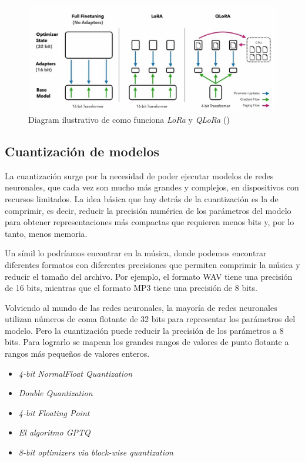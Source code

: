 \begin{figure}[H]
    \begin{center}
      \includegraphics[width=12cm]{figuras/Capitulo_03/QLoRa.jpg}
    \end{center}
    \caption[Diagram ilustrativo de como funciona \textit{LoRa} y \textit{QLoRa}]{Diagram ilustrativo de como funciona \textit{LoRa} y \textit{QLoRa} (\cite{DettmersTim2023QEFo})}
    \label{fig:qlora}
\end{figure}

\subsection{Cuantización de modelos}
\label{subsec:cuantizacion}


La cuantización surge por la necesidad de poder ejecutar modelos de redes neuronales,
que cada vez son mucho más grandes y complejos, en dispositivos con recursos limitados.
La idea básica que hay detrás de la cuantización es la de comprimir, es decir, reducir
la precisión numérica de los parámetros del modelo para obtener representaciones más
compactas que requieren menos bits y, por lo tanto, menos memoria.

Un símil lo podríamos encontrar en la música, donde podemos encontrar diferentes formatos
con diferentes precisiones que permiten comprimir la música y reducir el tamaño del archivo.
Por ejemplo, el formato WAV tiene una precisión de 16 bits, mientras que el formato MP3
tiene una precisión de 8 bits.

Volviendo al mundo de las redes neuronales, la mayoría de redes neuronales utilizan números
de coma flotante de 32 bits para representar los parámetros del modelo. Pero la cuantización
puede reducir la precisión de los parámetros a 8 bits. Para lograrlo se mapean los grandes
rangos de valores de punto flotante a rangos más pequeños de valores enteros.

\begin{itemize}
    \item \textit{4-bit NormalFloat Quantization} \cite{DettmersTim2023QEFo}
    \item \textit{Double Quantization} \cite{DettmersTim2023QEFo}
    \item \textit{4-bit Floating Point} \cite{DettmersTim2023QEFo}
    \item \textit{El algoritmo GPTQ} \cite{DettmersTim20218OvB}
    \item \textit{8-bit optimizers via block-wise quantization} \cite{FrantarElias2022GAPQ}
\end{itemize}

